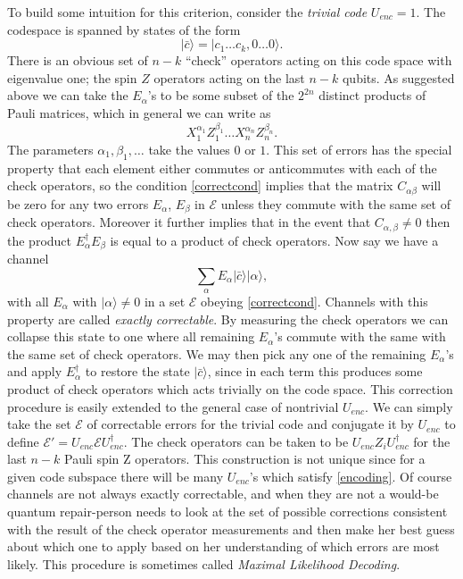 \documentclass[12pt]{article}
\newcommand{\be}{\begin{equation}}
\newcommand{\ee}{\end{equation}}
\newcommand{\ran}{\rangle}
\begin{document}
To build some intuition for this criterion, consider the \textit{trivial code} $U_{enc}=1$.  The codespace is spanned by states of the form
\be\label{trivcode}
|\bar{c}\ran=|c_1\ldots c_k, 0\ldots 0\ran.
\ee
There is an obvious set of $n-k$ ``check'' operators acting on this code space with eigenvalue one; the spin $Z$ operators acting on the last $n-k$ qubits.  As suggested above we can take the $E_\alpha$'s to be some subset of the $2^{2n}$ distinct products of Pauli matrices, which in general we can write as
\be\label{PauliProd}
X_1^{\alpha_1}Z_1^{\beta_1}\ldots X_n^{\alpha_n} Z_n^{\beta_n}.
\ee
The parameters $\alpha_1, \beta_1, \ldots$ take the values $0$ or $1$.  This set of errors has the special property that each element either commutes or anticommutes with each of the check operators, so the condition \eqref{correctcond} implies that the matrix $C_{\alpha\beta}$ will be zero for any two errors $E_\alpha$, $E_\beta$ in $\mathcal{E}$ unless they commute with the same set of check operators.  Moreover it further implies that in the event that $C_{\alpha,\beta}\neq 0$ then the product $E_\alpha^\dagger E_\beta$ is equal to a product of check operators.  Now say we have a channel
\be\label{errorstate}
\sum_\alpha E_\alpha|\bar{c}\ran|\alpha\ran,
\ee 
with all $E_\alpha$ with $|\alpha\ran\neq0$ in a set $\mathcal{E}$ obeying \eqref{correctcond}.  Channels with this property are called \textit{exactly correctable}.  By measuring the check operators we can collapse this state to one where all remaining $E_\alpha$'s commute with the same with the same set of check operators.  We may then pick any one of the remaining $E_\alpha$'s and apply $E_\alpha^\dagger$ to restore the state $|\bar{c}\ran$, since in each term this produces some product of check operators which acts trivially on the code space.  This correction procedure is easily extended to the general case of nontrivial $U_{enc}$.  We can simply take the set $\mathcal{E}$ of correctable errors for the trivial code and conjugate it by $U_{enc}$ to define $\mathcal{E'}=U_{enc}\mathcal{E}U_{enc}^\dagger$.  The check operators can be taken to be $U_{enc}Z_i U_{enc}^\dagger$ for the last $n-k$ Pauli spin Z operators.  This construction is not unique since for a given code subspace there will be many $U_{enc}$'s which satisfy \eqref{encoding}.  Of course channels are not always exactly correctable, and when they are not a would-be quantum repair-person needs to look at the set of possible corrections consistent with the result of the check operator measurements and then make her best guess about which one to apply based on her understanding of which errors are most likely.  This procedure is sometimes called \textit{Maximal Likelihood Decoding}.
\end{document}
